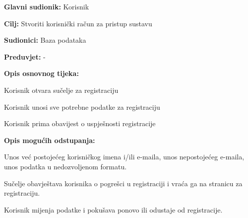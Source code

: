 					\noindent {}
					\begin{packed_item}
	
						\item \textbf{Glavni sudionik: }Korisnik
						\item  \textbf{Cilj: } Stvoriti korisnički račun za pristup sustavu
						\item  \textbf{Sudionici: } Baza podataka
						\item  \textbf{Preduvjet: } -
						\item  \textbf{Opis osnovnog tijeka:}
						
						\item[] \begin{packed_enum}
	
							\item Korisnik otvara sučelje za registraciju
							\item Korisnik unosi sve potrebne podatke za registraciju
							\item Korisnik prima obavijest o uspješnosti registracije
							
						\end{packed_enum}
						
						\item  \textbf{Opis mogućih odstupanja:}
						
						\item[] \begin{packed_item}
	
							\item[2.a] Unos već postojećeg korisničkog imena i/ili e-maila, unos nepostojećeg e-maila, unos podatka u nedozvoljenom formatu.
							\item[] \begin{packed_enum}
								
								\item Sučelje obavještava korisnika o pogrešci u registraciji i vraća ga na stranicu za registraciju.
								\item Korisnik mijenja podatke i pokušava ponovo ili odustaje od registracije.
								
							\end{packed_enum}
							
						\end{packed_item}
					\end{packed_item}
					

